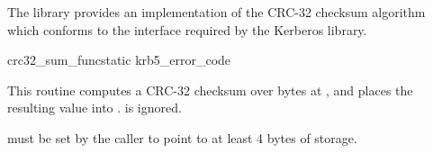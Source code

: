 The  library provides an implementation of the
CRC-32 checksum algorithm which conforms to the interface required by
the Kerberos library.

\begin{funcdecl}{crc32_sum_func}{static krb5_error_code}{\funcin}
\funcout
{}
\end{funcdecl}

This routine computes a CRC-32 checksum over  bytes
at , and places the resulting value into
.   is ignored.

 must be set by the caller to point
to at least 4 bytes of storage.

